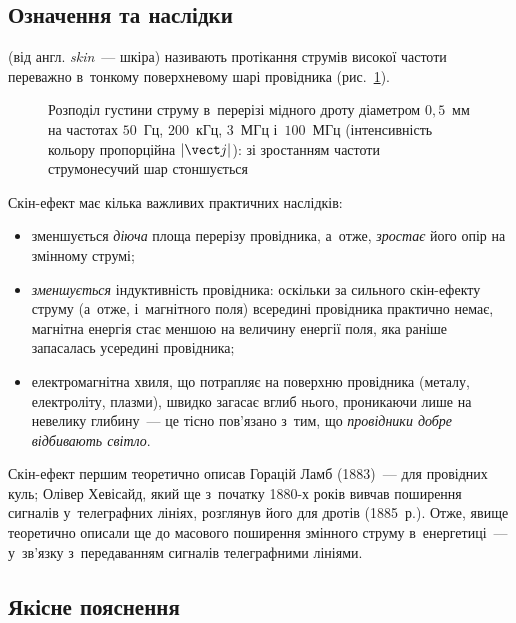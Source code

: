 \subsection*{Означення та наслідки}


 (від англ. \emph{skin}~--- шкіра) називають протікання струмів
високої частоти переважно в~тонкому поверхневому шарі провідника
(рис.~\ref{pic:SkinIllustration}).

\begin{figure}[htbp]\centering
	\caption{Розподіл густини струму в~перерізі мідного дроту діаметром $0{,}5$~мм на
	частотах $50$~Гц, $200$~кГц, $3$~МГц і~$100$~МГц (інтенсивність кольору пропорційна
	$|\vect j|$): зі зростанням частоти струмонесучий шар стоншується\label{pic:SkinIllustration}}
\end{figure}

Скін-ефект має кілька важливих практичних наслідків:
\begin{itemize}
	\item зменшується \emph{діюча} площа перерізу провідника, а~отже, \emph{зростає}
	  його опір на змінному струмі;
	\item \emph{зменшується} індуктивність провідника: оскільки за сильного скін-ефекту
	  струму (а~отже, і~магнітного поля) всередині провідника практично немає, магнітна
	  енергія стає меншою на величину енергії поля, яка раніше запасалась усередині
	  провідника;
	\item електромагнітна хвиля, що потрапляє на поверхню провідника (металу, електроліту,
	  плазми), швидко загасає вглиб нього, проникаючи лише на невелику глибину~--- це
	  тісно пов'язано з~тим, що \emph{провідники добре відбивають світло}.
\end{itemize}

\begin{Historical}
	Скін-ефект першим теоретично описав Горацій Ламб (1883)~--- для провідних куль; Олівер
	Хевісайд, який ще з~початку 1880-х років вивчав поширення сигналів у~телеграфних
	лініях, розглянув його для дротів (1885~р.). Отже, явище теоретично описали ще до
	масового поширення змінного струму в~енергетиці~--- у~зв'язку з~передаванням сигналів
	телеграфними лініями.
\end{Historical}


\subsection*{Якісне пояснення}


